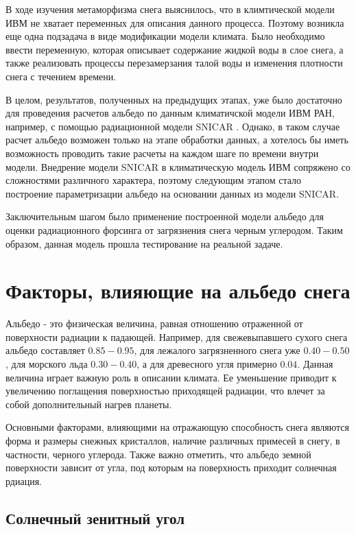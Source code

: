 \documentclass[a4paper, fontsize=14pt]{scrartcl}
\begin{document}
В ходе изучения метаморфизма снега выяснилось, что в климтической модели ИВМ не хватает переменных для описания данного процесса. Поэтому возникла еще одна подзадача в виде модификации модели климата. Было необходимо ввести переменную, которая описывает содержание жидкой воды в слое снега, а также реализовать процессы перезамерзания талой воды и изменения плотности снега с течением времени.

В целом, результатов, полученных на предыдущих этапах, уже было достаточно для проведения расчетов альбедо по данным климатичской модели ИВМ РАН, например, с помощью радиационной модели SNICAR \cite{Flanner2007}. Однако, в таком случае расчет альбедо возможен только на этапе обработки данных, а хотелось бы иметь возможность проводить такие расчеты на каждом шаге по времени внутри модели. Внедрение модели SNICAR в климатическую модель ИВМ сопряжено со сложностями различного характера, поэтому следующим этапом стало построение параметризации альбедо на основании данных из модели SNICAR. 

Заключительным шагом было применение построенной модели альбедо для оценки радиационного форсинга от загрязнения снега черным углеродом. Таким образом, данная модель прошла тестирование на реальной задаче. 


\newpage
\section{Факторы, влияющие на альбедо снега}
Альбедо - это физическая величина, равная отношению отраженной от поверхности радиации к падающей. Например, для свежевыпавшего сухого снега альбедо составляет $0.85-0.95$, для лежалого загрязненного снега уже $0.40-0.50$, для морского льда $0.30-0.40$, а для древесного угля примерно $0.04$. Данная величина играет важную роль в описании климата. Ее уменьшение приводит к увеличению поглащения поверхностью приходящей радиации, что влечет за собой дополнительный нагрев планеты. 

Основными факторами, влияющими на отражающую способность снега являются форма и размеры снежных кристаллов, наличие различных примесей в снегу, в частности, черного углерода. Также важно отметить, что альбедо земной поверхности зависит от угла, под которым на поверхность приходит солнечная рдиация.


\subsection{Солнечный зенитный угол}
\end{document}
